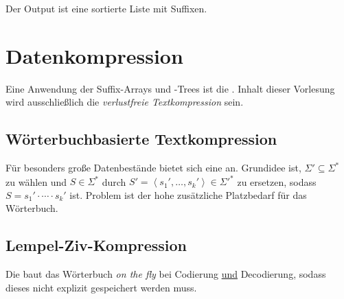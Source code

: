 Der Output ist eine sortierte Liste mit Suffixen. 


\section{Datenkompression}

Eine Anwendung der Suffix-Arrays und -Trees ist die . Inhalt dieser Vorlesung wird ausschließlich die \emph{verlustfreie Textkompression} sein.

\subsection{Wörterbuchbasierte Textkompression}

Für besonders große Datenbestände bietet sich eine  an. Grundidee ist, \( \Sigma' \subseteq \Sigma^\ast \) zu wählen und \( S \in \Sigma^* \) durch  \( S' = \left\langle s_1', \dots, s_k' \right\rangle \in \Sigma'^\ast \)  zu ersetzen, sodass \( S = s_1' \cdot \cdots \cdot s_k' \) ist. Problem ist der hohe zusätzliche Platzbedarf für das Wörterbuch.

\subsection{Lempel-Ziv-Kompression}

Die  baut das Wörterbuch \emph{on the fly} bei Codierung \underline{und} Decodierung, sodass dieses nicht explizit gespeichert werden muss. \\

